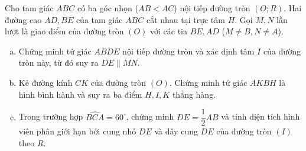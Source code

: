\begin{bt}%
Cho tam giác $ABC$ có ba góc nhọn ($AB < AC$) nội tiếp đường tròn $(O; R)$. Hai đường cao $AD, BE$ của tam giác $ABC$ cắt nhau tại trực tâm $H$. Gọi $M, N$ lần lượt là giao điểm của đường tròn $(O)$ với các tia $BE, AD$ ($M \neq B, N \neq A$).
\begin{enumerate}[a)]
	\item Chứng minh tứ giác $ABDE$ nội tiếp đường tròn và xác định tâm $I$ của đường tròn này, từ đó suy ra $DE \parallel MN$.
	\item Kẻ đường kính $CK$ của đường tròn $(O)$. Chứng minh tứ giác $AKBH$ là hình bình hành và suy ra ba điểm $H, I, K$ thẳng hàng.
	\item Trong trường hợp $\widehat{BCA} = 60^\circ$, chứng minh $DE = \dfrac{1}{2}AB$ và tính diện tích hình viên phân giới hạn bởi cung nhỏ $DE$ và dây cung $DE$ của đường tròn $(I)$ theo $R$.
\end{enumerate}
\end{bt}
